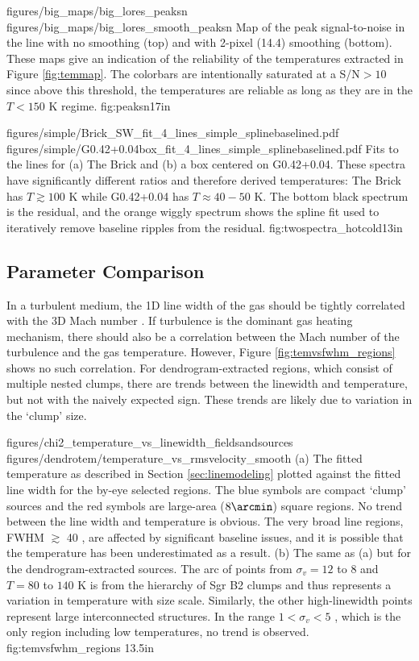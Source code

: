 \FigureTwoAA
{figures/big_maps/big_lores_peaksn}
{figures/big_maps/big_lores_smooth_peaksn}
{Map of the peak signal-to-noise in the \para \threeohthree line with no
smoothing (top) and with 2-pixel (14.4\arcsec) smoothing (bottom).  
These maps give an indication of the reliability of the temperatures extracted
in Figure \ref{fig:temmap}.  The colorbars are intentionally saturated at a
S/N$>10$ since above this threshold, the temperatures are reliable as long as
they are in the $T<150$ K regime.
}
{fig:peaksn}{1}{7in}


\FigureTwo
{figures/simple/Brick_SW_fit_4_lines_simple_splinebaselined.pdf}
{figures/simple/G0.42+0.04box_fit_4_lines_simple_splinebaselined.pdf}
{
Fits to the \para lines for (a) The Brick and (b) a box centered on G0.42+0.04.
These spectra have significantly different ratios and therefore derived temperatures:
The Brick has $T\gtrsim100$ K while G0.42+0.04 has $T\approx40-50$ K.
The bottom black spectrum is the residual, and the orange wiggly spectrum shows
the spline fit used to iteratively remove baseline ripples from the residual.}
{fig:twospectra_hotcold}{1}{3in}


\subsection{Parameter Comparison}
In a turbulent medium, the 1D line width of the gas should be tightly
correlated with the 3D Mach number \citep[e.g.][]{Federrath2011a}.  If
turbulence is the dominant gas heating mechanism, there should also be a
correlation between the Mach number of the turbulence and the gas temperature.
However, Figure \ref{fig:temvsfwhm_regions} shows no such correlation.  For
dendrogram-extracted regions, which consist of multiple nested clumps, there
are trends between the linewidth and temperature, but not with the naively
expected sign.  These trends are likely due to variation in the `clump' size.

\FigureTwo
{figures/chi2_temperature_vs_linewidth_fieldsandsources}
{figures/dendrotem/temperature_vs_rmsvelocity_smooth} %
{(a) 
The fitted temperature as described in Section \ref{sec:linemodeling} plotted
against the fitted line width for the by-eye selected regions.  The blue
symbols are compact `clump' sources and the red symbols are large-area
($8\arcmin$) square regions.  No trend between the line width and temperature
is obvious.  The very broad line regions, FWHM $\gtrsim$ 40 \kms, are affected
by significant baseline issues, and it is possible that the temperature has been
underestimated as a result.
(b) The same as (a) but for the dendrogram-extracted sources.  The arc of points
from $\sigma_v=12$ to $8$ \kms and $T=80$ to $140$ K is from the hierarchy of
Sgr B2 clumps and thus represents a variation in temperature with size scale.
Similarly, the other high-linewidth points represent large interconnected
structures.  In the range $1 < \sigma_v < 5$ \kms, which is the only region
including low temperatures, no trend is observed.}
{fig:temvsfwhm_regions}
{1}{3.5in}



